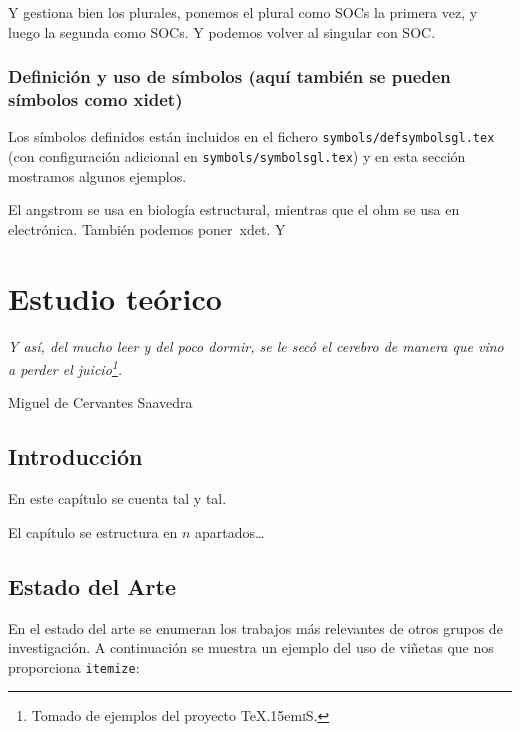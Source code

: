 \documentclass[spanish,openright]{book}
\def\texis{\TeX \raise.15em\hbox{\textsc{i}}S}
\newenvironment{FraseCelebre}{\begin{list}{}{\setlength{\leftmargin}{0.5\textwidth}\setlength{\parsep}{0cm}\addtolength{\topsep}{0.5cm}}
  }
  {\unskip \end{list}}
\newenvironment{Frase}{\item \begin{flushright}\small\em}{\end{flushright}}
\newenvironment{Fuente}{\item \begin{flushright}\small}{\end{flushright}}
\begin{document}
Y gestiona bien los plurales, ponemos el plural como \acp{SOC} la
primera vez, y luego la segunda como \acp{SOC}. Y podemos volver al
singular con \ac{SOC}.


\subsection{Definición y uso de símbolos (aquí también
  se pueden símbolos como \ac{xidet})}
\label{sec:simbolos}

Los símbolos definidos están incluidos en el fichero
\texttt{symbols/defsymbolsgl.tex} (con configuración adicional en
\texttt{symbols/symbolsgl.tex}) y en esta sección mostramos algunos
ejemplos.

El \ac{angstrom} se usa en biología estructural, mientras que el
\ac{ohm} se usa en electrónica. También podemos poner~\ac{xdet}. Y
 


\chapter{Estudio teórico}
\label{cha:estudio-teorico}

\begin{FraseCelebre}
  \begin{Frase}
    Y así, del mucho leer y del poco dormir, se le secó el cerebro de
    manera que vino a perder el juicio\footnote{Tomado de ejemplos del
      proyecto \texis{}.}.
  \end{Frase}
  \begin{Fuente}
    Miguel de Cervantes Saavedra
  \end{Fuente}
\end{FraseCelebre}


\section{Introducción}
\label{sec:introduccion-teoria}

En este capítulo se cuenta tal y tal.

El capítulo se estructura en $n$ apartados\ldots


\section{Estado del Arte}
\label{sec:estadoarte}

En el estado del arte se enumeran los trabajos más relevantes de otros
grupos de investigación. A continuación se muestra un ejemplo del uso de
viñetas que nos proporciona \texttt{itemize}:
\end{document}
